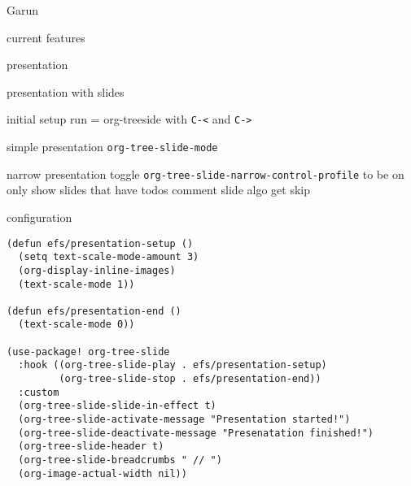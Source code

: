 \documentclass[presentation]{beamer}
\begin{document}
\begin{frame}[label={sec:org5d134d3},fragile]{Garun}
\begin{block}{current features}
\begin{block}{presentation}
\begin{block}{presentation with slides}
\begin{block}{initial setup}
run = org-treeside with \texttt{C-<} and \texttt{C->}
\end{block}
\begin{block}{simple presentation}
\texttt{org-tree-slide-mode}
\end{block}
\begin{block}{narrow presentation}
toggle \texttt{org-tree-slide-narrow-control-profile} to be on
only show slides that have todos
comment slide algo get skip
\end{block}
\begin{block}{configuration}
\begin{verbatim}
(defun efs/presentation-setup ()
  (setq text-scale-mode-amount 3)
  (org-display-inline-images)
  (text-scale-mode 1))

(defun efs/presentation-end ()
  (text-scale-mode 0))

(use-package! org-tree-slide
  :hook ((org-tree-slide-play . efs/presentation-setup)
         (org-tree-slide-stop . efs/presentation-end))
  :custom
  (org-tree-slide-slide-in-effect t)
  (org-tree-slide-activate-message "Presentation started!")
  (org-tree-slide-deactivate-message "Presenatation finished!")
  (org-tree-slide-header t)
  (org-tree-slide-breadcrumbs " // ")
  (org-image-actual-width nil))
\end{verbatim}
\end{block}
\end{block}
\end{block}
\end{block}
\end{frame}
\end{document}
